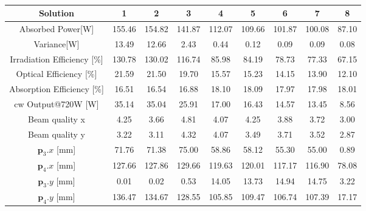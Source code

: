 \documentclass[a4paper,10pt]{article}
\renewcommand{\vec}[1]{\mathbf{#1}}
\begin{document}
    \begin{table}
    \centering
    \setlength\tabcolsep{2pt}
    \renewcommand{\arraystretch}{1.5}
    \begin{tabular}{| c | c | c | c | c | c | c | c | c |}
        \hline
        Solution      &1&2&3&4&5&6&7&8\\
        \hline
        Absorbed Power[W] &155.46&154.82&141.87&112.07&109.66&101.87&100.08&87.10\\
        \hline
        Variance[W] &13.49&12.66&2.43&0.44&0.12&0.09&0.09&0.08\\
        \hline
        Irradiation Efficiency [\%]&130.78&130.02&116.74&85.98&84.19&78.73&77.33&67.15\\
        \hline
        Optical Efficiency [\%]&21.59&21.50&19.70&15.57&15.23&14.15&13.90&12.10\\
        \hline
        Absorption Efficiency [\%]&16.51&16.54&16.88&18.10&18.09&17.97&17.98&18.01\\
        \hline
        cw Output@720W [W]  &35.14&35.04&25.91&17.00&16.43&14.57&13.45&8.56\\
        \hline
        Beam quality x&4.25&3.66&4.81&4.07&4.25&3.88&3.72&3.00\\
        \hline
        Beam quality y&3.22&3.11&4.32&4.07&3.49&3.71&3.52&2.87\\
        \hline
        $\vec{p}_3.x$ [mm]&71.76&71.38&75.00&58.86&58.12&55.30&55.00&0.89\\ 
        \hline
        $\vec{p}_4.x$ [mm]&127.66&127.86&129.66&119.63&120.01&117.17&116.90&78.08\\ 
        \hline
        $\vec{p}_3.y$ [mm]&0.01&0.02&0.53&14.05&13.73&14.94&14.75&3.22\\ 
        \hline
        $\vec{p}_4.y$ [mm]&136.47&134.67&128.55&105.85&109.47&106.74&107.39&17.17\\ 
        \hline
    \end{tabular}
    \label{tab:setup1_results}
    \caption[]{}
    \end{table}
\end{document}
